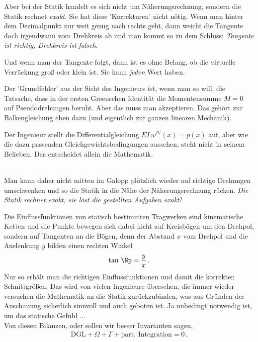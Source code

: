 {Aber bei der Statik handelt es sich nicht um N\"{a}herungsrechnung, sondern die Statik rechnet {\em exakt\/}. Sie hat diese 'Korrekturen' nicht n\"{o}tig. Wenn man hinter dem Dezimalpunkt nur weit genug nach rechts geht, dann weicht die Tangente doch irgendwann vom Drehkreis ab und man kommt so zu dem Schluss: {\em Tangente ist richtig, Drehkreis ist falsch\/}.

Und wenn man der Tangente folgt, dann ist es ohne Belang, ob die virtuelle Verr\"{u}ckung gro{\ss} oder klein ist. Sie kann {\em jeden\/} Wert haben.

Der 'Grundfehler' aus der Sicht des Ingenieurs ist, wenn man so will, die Tatsache, dass in der ersten Greenschen Identit\"{a}t die Momentensumme $M = 0$ auf Pseudodrehungen beruht. Aber das muss man akzeptieren. Das geh\"{o}rt zur Balkengleichung eben dazu (und eigentlich zur ganzen linearen Mechanik).

\hspace*{-12pt}\colorbox{hellgrau}{\parbox{0.98\textwidth}{Der Ingenieur stellt die Differentialgleichung $EI\,w^{IV}(x) = p(x)$ auf, aber wie die dazu passenden Gleichgewichtsbedingungen aussehen, steht nicht in seinem Belieben. Das entscheidet allein die Mathematik.}}\\

Man kann daher nicht mitten im Galopp pl\"{o}tzlich wieder auf richtige Drehungen umschwenken und so die Statik in die N\"{a}he der N\"{a}herungsrechnung r\"{u}cken. {\em Die Statik rechnet exakt, sie l\"{o}st die gestellten Aufgaben exakt!\/}

Die Einflussfunktionen von statisch bestimmten Tragwerken sind kinematische Ketten und die Punkte bewegen sich dabei nicht auf Kreisb\"{o}gen um den Drehpol, sondern auf Tangenten an die B\"{o}gen, denn der Abstand $x$ vom Drehpol und die Auslenkung $y$ bilden einen rechten Winkel
\begin{align}
\tan\,\Np = \frac{y}{x}\,.
\end{align}
Nur so erh\"{a}lt man die richtigen Einflussfunktionen und damit die korrekten Schnittgr\"{o}{\ss}en.
Das wird von vielen Ingenieure \"{u}bersehen, die immer wieder versuchen die Mathematik an die Statik zur\"{u}ckzubinden, was aus Gr\"{u}nden der Anschauung sicherlich sinnvoll und auch geboten ist. Ja unbedingt notwendig ist, um das statische Gef\"{u}hl ...\\

 Von diesen Bilanzen, oder sollen wir besser Invarianten sagen,
\begin{align}
\text{DGL} + \Omega + \Gamma + \text{part. Integration} = 0\,.
\end{align}

}
